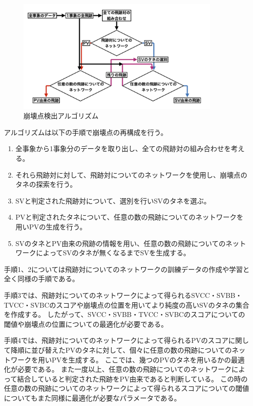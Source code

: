 \begin{figure}[htbp]
 \centering
 \includegraphics[width=0.9\textwidth, clip]{Figure/4VertexFinderwithDL/4-1-0-1VertexFinderAlgorithm.png}
 \caption{崩壊点検出アルゴリズム}
 \label{4-1-0-1VertexFinderAlgorithm}
\end{figure}

アルゴリズムは以下の手順で崩壊点の再構成を行う。

\begin{enumerate}
 \item 全事象から1事象分のデータを取り出し、全ての飛跡対の組み合わせを考える。
 \item それら飛跡対に対して、飛跡対についてのネットワークを使用し、崩壊点のタネの探索を行う。
 \item SVと判定された飛跡対について、選別を行いSVのタネを選ぶ。
 \item PVと判定されたタネについて、任意の数の飛跡についてのネットワークを用いPVの生成を行う。
 \item SVのタネとPV由来の飛跡の情報を用い、任意の数の飛跡についてのネットワークによってSVのタネが無くなるまでSVを生成する。
\end{enumerate}

手順1、2については飛跡対についてのネットワークの訓練データの作成や学習と全く同様の手順である。

手順3では、飛跡対についてのネットワークによって得られるSVCC・SVBB・TVCC・SVBCのスコアや崩壊点の位置を用いてより純度の高いSVのタネの集合を作成する。
したがって、SVCC・SVBB・TVCC・SVBCのスコアについての閾値や崩壊点の位置についての最適化が必要である。

手順4では、飛跡対についてのネットワークによって得られるPVのスコアに関して降順に並び替えたPVのタネに対して、個々に任意の数の飛跡についてのネットワークを用いPVを生成する。
ここでは、幾つのPVのタネを用いるかの最適化が必要である。
また一度以上、任意の数の飛跡についてのネットワークによって結合していると判定された飛跡をPV由来であると判断している。
この時の任意の数の飛跡についてのネットワークによって得られるスコアについての閾値についてもまた同様に最適化が必要なパラメータである。

